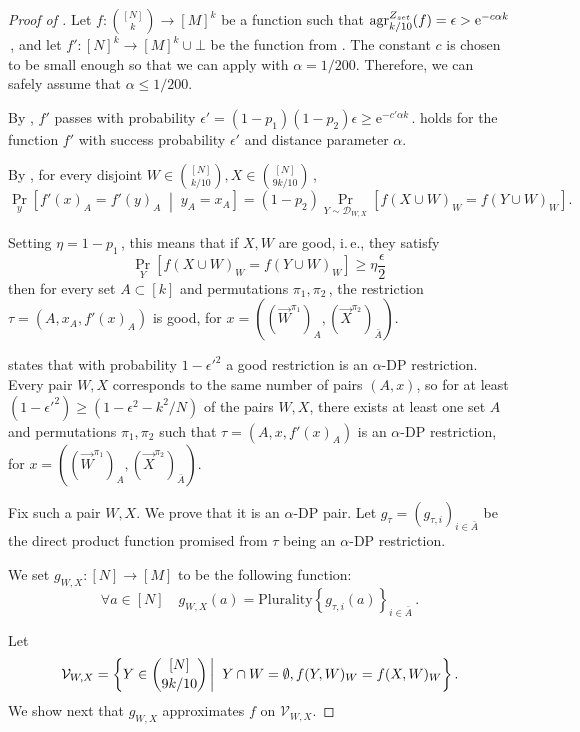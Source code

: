 \documentclass[11pt]{article}
\numberwithin{equation}{section}
\theoremstyle{definition}
\theoremstyle{plain}
\newcommand{\eee}{\mathrm e}
\newcommand{\ie}{i.\,e.}
\newcommand{\Prob}[2][]{\Pr_{{#1}}\left[#2\right]} %
\newcommand{\given}{\;\middle\vert\;} %
\newcommand\sett[2]{\left\{ #1 \left| \; \vphantom{#1 #2} \right. #2  \right\}} %
\newcommand{\Set}[1]{\left\{#1\right\}} %
\newcommand\f{f} %
\newcommand\setf{f} %
\newcommand{\g}{g} %
\newcommand{\test}[2]{
	\ifx &#2&
	\textrm{agr}^{#1}
	\else	
	\textrm{agr}^{#1}_{#2}
	\fi}
\newcommand{\sets}{\binom{[N]}{k}} %
\newcommand\rest[1]{{\bar{#1}}}  %
\begin{document}
\begin{proof}[Proof of ]
	Let  $\setf:\sets\rightarrow[M]^k$ be a function such that $\test{Z_{set}}{k/10}(\setf)=\epsilon > \eee^{-c\alpha k}$\,, and let $\f':[N]^k\rightarrow[M]^k\cup\bot$ be the function from .
	The constant $c$ is chosen to be small enough so that we can apply  with $\alpha = 1/200$. Therefore, we can safely assume that $\alpha \leq 1/200$.
	
	By , $\f'$ passes  with probability $\epsilon'=(1-p_1)(1-p_2)\epsilon\geq \eee^{-c'\alpha k}$\,.  holds for the function $\f'$ with success probability $\epsilon'$ and distance parameter $\alpha$.
	
	By , for every disjoint $W\in\binom{[N]}{k/10},X\in\binom{[N]}{9k/10} $\,,
	\[ \Prob[y]{\f'(x)_A = \f'(y)_A \given y_A=x_A} =(1-p_2)\Prob[Y\sim\mathcal{D}_{W,X}]{\setf(X\cup W)_W = \setf(Y\cup W)_W}. \]
	
	
	Setting $\eta=1-p_1$\,, this means that if $X,W$ are good, \ie, 
%
they satisfy  %
%
\[\Prob[Y]{\setf(X\cup W)_W = \setf(Y\cup W)_W}\geq\eta\frac{\epsilon}{2}\,\]   %
then for every set $A\subset[k]$ and permutations $\pi_1,\pi_2$\,, the restriction $\tau = (A,x_A,\f'(x)_A)$ is good, for $x=((\vec W^{\pi_1})_A,(\vec X^{\pi_2})_{\rest A})$.
	
 states that with probability $1-\epsilon'^2$ a good restriction is an $\alpha$-DP restriction.  Every
%
pair $W,X$ corresponds  %
to the same number of
pairs   %
$(A,x)$, so for at least 
	$(1-\epsilon'^2) \geq (1-\epsilon^2 - k^2/N)$ %
of the %
pairs  %
$W,X$, there exists at least one set $A$ and permutations $\pi_1,\pi_2$ such that $\tau = (A,x,\f'(x)_A)$ is an $\alpha$-DP restriction, for $x=((\vec W^{\pi_1})_A,(\vec X^{\pi_2})_{\rest A})$.
	
	Fix such a pair $W,X$. We prove that it is an $\alpha$-DP pair. 
	Let $\g_\tau = (\g_{\tau,i})_{i\in\rest{A}}$ be the direct product function promised from $\tau$ being an $\alpha$-DP restriction.

	We set $\g_{W,X}:[N]\rightarrow[M]$ to be the following function: 
	\[  \forall a\in [N] \quad \g_{W,X}(a) = \textrm{Plurality}\Set{\g_{\tau,i}(a)}_{i\in\rest{A}}\,. \]
	
	Let 
	\[ \mathcal{V}_{W,X}= \sett{Y\in\binom{[N]}{9k/10}}{Y\cap W=\emptyset, \setf(Y,W)_W=\setf(X,W)_W}.\]
We show next that $\g_{W,X}$ approximates $\setf$ on $\mathcal{V}_{W,X}$. 
	

\end{proof}
\end{document}
